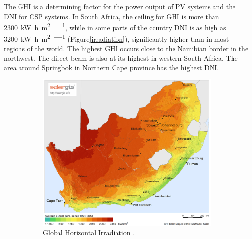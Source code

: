 The \ac{GHI} is a determining factor for the power output of \ac{PV} systems and the \ac{DNI} for \ac{CSP} systems. In South Africa, the ceiling for \ac{GHI} is more than \SI{2300}{\kilo\watt\hour\per\square\metre\per\year}, while in some parts of the country \ac{DNI} is as high as \SI{3200}{\kilo\watt\hour\per\square\metre\per\year} (Figure\ref{irradiation}), significantly higher than in most regions of the world. The highest \ac{GHI} occurs close to the Namibian border in the northwest. The direct beam is also at its highest in western South Africa. The area around Springbok in Northern Cape province has the highest \ac{DNI}.

\begin{figure}[h!]
        \centering
        \begin{subfigure}[b]{0.5\textwidth}
                \centering
                \includegraphics[width=1\textwidth]{FIG/SA_GHI}
                \caption{Global Horizontal Irradiation \cite{SolarGIS2015a}.}\label{fig:bild-links}
        \end{subfigure}%
        ~
        \begin{subfigure}[b]{0.5\textwidth}
                \centering

\end{subfigure}
\end{figure}
